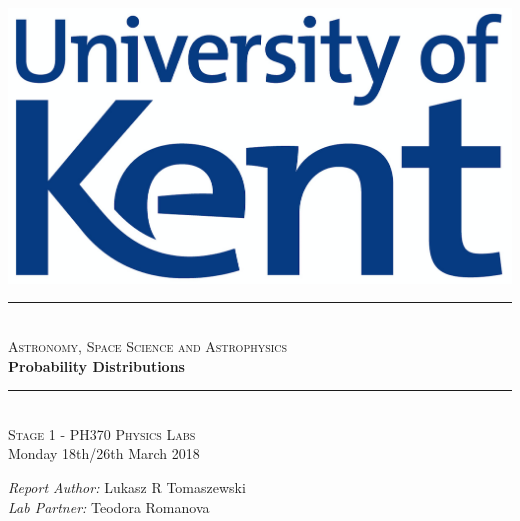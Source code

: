 \documentclass[11pt]{article}
\begin{document}
\begin{titlepage}

\newcommand{\HRule}{\rule{\linewidth}{0.5mm}}

\begin{centering} 
 

\includegraphics[scale=0.4]{Uni_of_Kent_Logo.png}\\[1cm]


\HRule \\[0.4cm]
\textsc{\large Astronomy, Space Science and Astrophysics}\\[0.4cm]
{\Huge \bfseries Probability Distributions}\\[0.4cm]
\HRule \\[1.0cm]


\textsc{\Large Stage 1 - PH370 Physics Labs}\\[0.5cm] 
{\large Monday 18th/26th March 2018}\\[1.0cm]


\begin{minipage}{0.625\textwidth}
\centering

\emph{\large Report Author:} \large Lukasz R Tomaszewski \\ [0.2cm]
\emph{\large Lab Partner:} \large Teodora Romanova \\

\end{minipage}\\[2cm]

\vfill
\end{centering} 
\end{titlepage}
\end{document}
